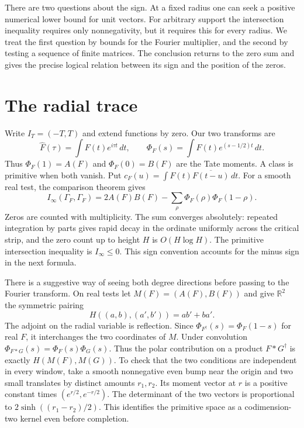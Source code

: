 \documentclass[11pt]{amsart}
\theoremstyle{definition}
\theoremstyle{remark}
\begin{document}
There are two questions about the sign. At a fixed radius one can seek a
positive numerical lower bound for unit vectors. For arbitrary support the
intersection inequality requires only nonnegativity, but it requires this
for every radius. We treat the first question by bounds for the Fourier
multiplier, and the second by testing a sequence of finite matrices. The
conclusion returns to the zero sum and gives the precise logical relation
between its sign and the position of the zeros.

\section{The radial trace}\label{sec:trace}
Write $I_T=(-T,T)$ and extend functions by zero. Our two transforms are
\[
 \widehat F(\tau)=\int F(t)e^{i\tau t}\,dt,\qquad
 \Phi_F(s)=\int F(t)e^{(s-1/2)t}\,dt .
\]
Thus $\Phi_F(1)=A(F)$ and $\Phi_F(0)=B(F)$ are the Tate moments.
A class is primitive when both vanish. Put
$c_F(u)=\int F(t)\overline{F(t-u)}\,dt$.
For a smooth real test, the comparison theorem \cite[Theorem~C]{Paper45} gives
\begin{equation}\label{comparison}
 I_\infty(\Gamma_F,\Gamma_F)
 =2A(F)B(F)-\sum_\rho\Phi_F(\rho)\Phi_F(1-\rho).
\end{equation}
Zeros are counted with multiplicity. The sum converges absolutely: repeated
integration by parts gives rapid decay in the ordinate uniformly across
the critical strip, and the zero count up to height $H$ is $O(H\log H)$.
The primitive intersection inequality is $I_\infty\le0$. This sign
convention accounts for the minus sign in the next formula.


There is a suggestive way of seeing both degree directions before passing
to the Fourier transform. On real tests let $M(F)=(A(F),B(F))$ and give
$\mathbb R^2$ the symmetric pairing
\[
 H((a,b),(a',b'))=ab'+ba'.
\]
The adjoint on the radial variable is reflection. Since
$\Phi_{F^\dagger}(s)=\Phi_F(1-s)$ for real $F$, it interchanges the two
coordinates of $M$. Under convolution $\Phi_{F*G}(s)=\Phi_F(s)\Phi_G(s)$.
Thus the polar contribution on a product $F*G^\dagger$ is exactly
$H(M(F),M(G))$. To check that the two conditions are independent in
every window, take a smooth nonnegative even bump near the origin and
two small translates by distinct amounts $r_1,r_2$. Its moment vector
at $r$ is a positive constant times $(e^{r/2},e^{-r/2})$. The determinant
of the two vectors is proportional to $2\sinh((r_1-r_2)/2)$.
This identifies the primitive space as a codimension-two kernel even
before completion.
\end{document}
